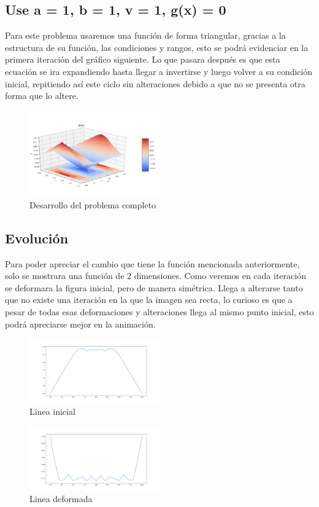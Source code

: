 \documentclass[letterpaper, 12 pt, conference]{ieeeconf}
\begin{document}
\subsection{Use a = 1, b = 1, v = 1, g(x) = 0}
Para este problema usaremos una función de forma triangular, gracias a la estructura de su función, las condiciones y rangos, esto se podrá evidenciar en la primera iteración del gráfico siguiente. Lo que pasara después es que esta ecuación se ira expandiendo hasta llegar a invertirse y luego volver a su condición inicial, repitiendo así este ciclo sin alteraciones debido a que no se presenta otra forma que lo altere.
\begin{figure}[H]
    \centering
    \includegraphics[width=0.5\textwidth]{desafio.png}
    \caption{Desarrollo del problema completo}
\end{figure}
\subsection{Evolución}
Para poder apreciar el cambio que tiene la función mencionada anteriormente, solo se mostrara una función de 2 dimensiones. Como veremos en cada iteración se deformara la figura inicial, pero de manera simétrica. Llega a alterarse tanto que no existe una iteración en la que la imagen sea recta, lo curioso es que a pesar de todas esas deformaciones y alteraciones llega al mismo punto inicial, esto podrá apreciarse mejor en la animación.
\begin{figure}[H]
    \centering
    \includegraphics[width=0.5\textwidth]{des 1.png}
    \caption{Linea inicial}
\end{figure}
\begin{figure}[H]
    \centering
    \includegraphics[width=0.5\textwidth]{des 3.png}
    \caption{Linea deformada}
\end{figure}
\end{document}

